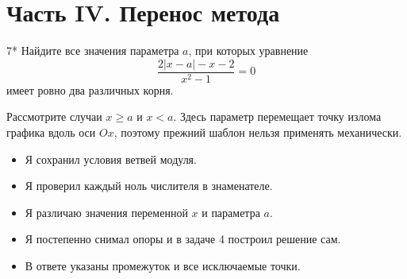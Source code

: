 \newpage
\section*{Часть IV. Перенос метода}

\begin{homeworktask}{7*}
  Найдите все значения параметра \(a\), при которых уравнение
  \[
    \frac{2|x-a|-x-2}{x^2-1}=0
  \]
  имеет ровно два различных корня.

  \begin{hintbox}
    Рассмотрите случаи \(x\ge a\) и \(x<a\). Здесь параметр перемещает
    точку излома графика вдоль оси \(Ox\), поэтому прежний шаблон нельзя
    применять механически.
  \end{hintbox}
\end{homeworktask}
\solutionmap

\begin{selfcheck}
  \begin{itemize}[label=\(\square\),leftmargin=1.7em,itemsep=0.25em,topsep=0.2em]
    \item Я сохранил условия ветвей модуля.
    \item Я проверил каждый ноль числителя в знаменателе.
    \item Я различаю значения переменной \(x\) и параметра \(a\).
    \item Я постепенно снимал опоры и в задаче 4 построил решение сам.
    \item В ответе указаны промежуток и все исключаемые точки.
  \end{itemize}
\end{selfcheck}
